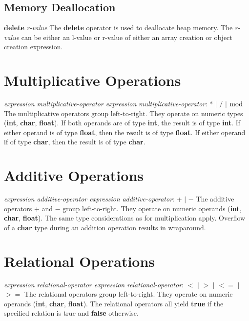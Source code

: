 \begin{homeworkProblem}
    \subsection{Memory Deallocation}
    \textbf{delete} \textit{r-value}
    \newline
    The \textbf{delete} operator is used to deallocate heap memory. The \textit{r-value} can be either an l-value or r-value of either an array creation or object creation expression.

    \section{Multiplicative Operations}
    \textit{expression multiplicative-operator expression}
    \newline
    \textit{multiplicative-operator}: * $|$ $/$ $|$ $\bmod$
    \newline
The multiplicative operators group left-to-right. They operate on numeric types (\textbf{int}, \textbf{char}, \textbf{float}). If both operands are of type \textbf{int}, the result is of type \textbf{int}. If either operand is of type \textbf{float}, then the result is of type \textbf{float}. If either operand if of type \textbf{char}, then the result is of type \textbf{char}.

    \section{Additive Operations}
    \textit{expression additive-operator expression}
    \newline
    \textit{additive-operator}: + $|$ $-$
    \newline
The additive operators + and − group left-to-right. They operate on numeric operands (\textbf{int}, \textbf{char}, \textbf{float}). The same type considerations as for multiplication apply. Overflow of a \textbf{char} type during an addition operation results in wraparound.

    \section{Relational Operations}
        \textit{expression relational-operator expression}
    \newline
    \textit{relational-operator}: $<$ $|$ $>$ $|$ $<=$ $|$ $>=$
    \newline
The relational operators group left-to-right. They operate on numeric operands (\textbf{int}, \textbf{char}, \textbf{float}). The relational operators all yield \textbf{true} if the specified relation is true and \textbf{false} otherwise.


\end{homeworkProblem}
